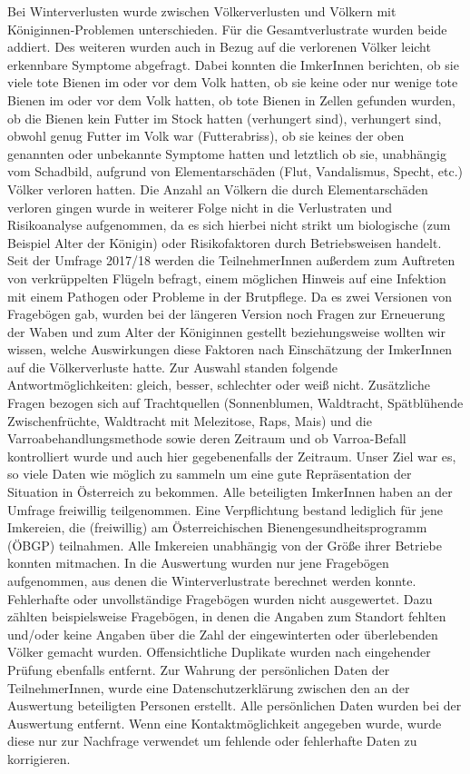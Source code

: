 \newline
Bei Winterverlusten wurde zwischen Völkerverlusten und Völkern mit Königinnen-Problemen unterschieden. Für die Gesamtverlustrate wurden beide addiert. Des weiteren wurden auch in Bezug auf die verlorenen Völker leicht erkennbare Symptome abgefragt. Dabei konnten die ImkerInnen berichten, ob sie viele tote Bienen im oder vor dem Volk hatten, ob sie keine oder nur wenige tote Bienen im oder vor dem Volk hatten, ob tote Bienen in Zellen gefunden wurden, ob die Bienen kein Futter im Stock hatten (verhungert sind), verhungert sind, obwohl genug Futter im Volk war (Futterabriss), ob sie keines der oben genannten oder unbekannte Symptome hatten und letztlich ob sie, unabhängig vom Schadbild, aufgrund von Elementarschäden (Flut, Vandalismus, Specht, etc.) Völker verloren hatten. Die Anzahl an Völkern die durch Elementarschäden verloren gingen wurde in weiterer Folge nicht in die Verlustraten und Risikoanalyse aufgenommen, da es sich hierbei nicht strikt um biologische (zum Beispiel Alter der Königin) oder Risikofaktoren durch Betriebsweisen handelt. Seit der Umfrage 2017/18 werden die TeilnehmerInnen außerdem zum Auftreten von verkrüppelten Flügeln befragt, einem möglichen Hinweis auf eine Infektion mit einem Pathogen oder Probleme in der Brutpflege.
\newline
Da es zwei Versionen von Fragebögen gab, wurden bei der längeren Version noch Fragen zur Erneuerung der Waben und zum Alter der Königinnen gestellt beziehungsweise wollten wir wissen, welche Auswirkungen diese Faktoren nach Einschätzung der ImkerInnen auf die Völkerverluste hatte. Zur Auswahl standen folgende Antwortmöglichkeiten: gleich, besser, schlechter oder weiß nicht. Zusätzliche Fragen bezogen sich auf Trachtquellen (Sonnenblumen, Waldtracht, Spätblühende Zwischenfrüchte, Waldtracht mit Melezitose, Raps, Mais) und die Varroabehandlungsmethode sowie deren Zeitraum und ob Varroa-Befall kontrolliert wurde und auch hier gegebenenfalls der Zeitraum. 
\newline
Unser Ziel war es, so viele Daten wie möglich zu sammeln um eine gute Repräsentation der Situation in Österreich zu bekommen. Alle beteiligten ImkerInnen haben an der Umfrage freiwillig teilgenommen. Eine Verpflichtung bestand lediglich für jene Imkereien, die (freiwillig) am Österreichischen Bienengesundheitsprogramm (ÖBGP) teilnahmen. Alle Imkereien unabhängig von der Größe ihrer Betriebe konnten mitmachen. In die Auswertung wurden nur jene Fragebögen aufgenommen, aus denen die Winterverlustrate berechnet werden konnte. Fehlerhafte oder unvollständige Fragebögen wurden nicht ausgewertet. Dazu zählten beispielsweise Fragebögen, in denen die Angaben zum Standort fehlten und/oder keine Angaben über die Zahl der eingewinterten oder überlebenden Völker gemacht wurden.  Offensichtliche Duplikate wurden nach eingehender Prüfung ebenfalls entfernt.
\newline
Zur Wahrung der persönlichen Daten der TeilnehmerInnen, wurde eine Datenschutzerklärung zwischen den an der Auswertung beteiligten Personen erstellt. Alle persönlichen Daten wurden bei der Auswertung entfernt. Wenn eine Kontaktmöglichkeit angegeben wurde, wurde diese nur zur Nachfrage verwendet um fehlende oder fehlerhafte Daten zu korrigieren.

